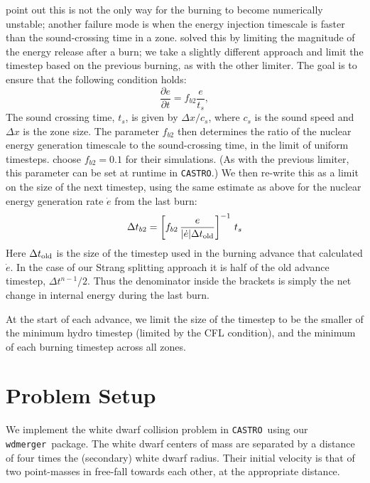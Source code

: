 \documentclass[twocolumn,numberedappendix]{../aastex6}
\newcommand{\castro}{\texttt{CASTRO}}
\newcommand{\wdmerger}{\texttt{wdmerger}}
\begin{document}
\citet{kushnir:2013} point out this is not the only way for the burning to
become numerically unstable; another failure mode is when the energy injection timescale
is faster than the sound-crossing time in a zone. \citet{kushnir:2013} solved this by
limiting the magnitude of the energy release after a burn; we take a slightly different
approach and limit the timestep based on the previous burning, as with the other limiter.
The goal is to ensure that the following condition holds:
\begin{equation}
  \frac{\partial e}{\partial t} = f_{b2} \frac{e}{t_s},
\end{equation}
The sound crossing time, $t_s$, is given by $\Delta x / c_s$, where $c_s$ is the sound speed
and $\Delta x$ is the zone size. The parameter $f_{b2}$ then determines the ratio of the
nuclear energy generation timescale to the sound-crossing time, in the limit of uniform
timesteps. \citet{kushnir:2013} choose $f_{b2} = 0.1$ for their simulations.
(As with the previous limiter, this parameter can be set at runtime in \castro.)
We then re-write this as a limit on the size of the next timestep, using the same
estimate as above for the nuclear energy generation rate $\dot{e}$ from the last burn:
\begin{equation}
  \Delta t_{b2} = \left[f_{b2}\, \frac{e}{|\dot{e}| \Delta t_{\rm{old}}}\right]^{-1}\, {t_s}
\end{equation}
Here $\Delta t_{\rm{old}}$ is the size of the timestep used in the burning advance that calculated
$\dot{e}$. In the case of our Strang splitting approach it is half of the old advance
timestep, $\Delta t^{n-1} / 2$. Thus the denominator inside the brackets is simply the net
change in internal energy during the last burn.

At the start of each advance, we limit the size of the timestep to be the smaller
of the minimum hydro timestep (limited by the CFL condition), and the minimum of each
burning timestep across all zones.



\section{Problem Setup}
\label{sec:problemsetup}

We implement the white dwarf collision problem in \castro\ using our \wdmerger\
package. The white dwarf centers of mass are separated by a distance of four times
the (secondary) white dwarf radius. Their initial velocity is that of
two point-masses in free-fall towards each other, at the appropriate distance.
\end{document}
